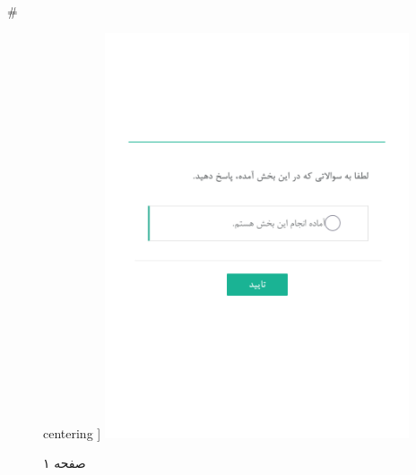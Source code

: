 { 
 # 
\begin{figure}[htpb]
centering ]
\includegraphics[width=0.8\textwidth]{./img/Task4.png/}
\caption{صفحه ۱}
\label{fig:Task1}
\end{figure}
 
}
